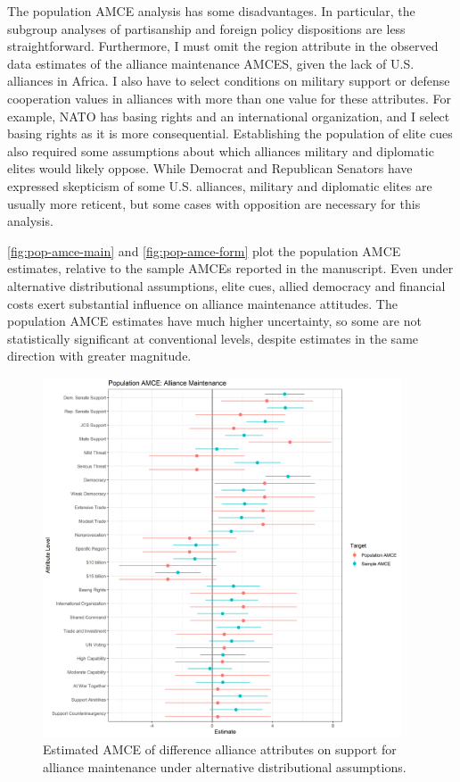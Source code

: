 \documentclass[12pt]{article}
\begin{document}
The population AMCE analysis has some disadvantages. 
In particular, the subgroup analyses of partisanship and foreign policy dispositions are less straightforward. 
Furthermore, I must omit the region attribute in the observed data estimates of the alliance maintenance AMCES, given the lack of U.S. alliances in Africa. 
I also have to select conditions on military support or defense cooperation values in alliances with more than one value for these attributes. 
For example, NATO has basing rights and an international organization, and I select basing rights as it is more consequential.  
Establishing the population of elite cues also required some assumptions about which alliances military and diplomatic elites would likely oppose.
While Democrat and Republican Senators have expressed skepticism of some U.S. alliances, military and diplomatic elites are usually more reticent, but some cases with opposition are necessary for this analysis. 


\autoref{fig:pop-amce-main} and \autoref{fig:pop-amce-form} plot the population AMCE estimates, relative to the sample AMCEs reported in the manuscript. 
Even under alternative distributional assumptions, elite cues, allied democracy and financial costs exert substantial influence on alliance maintenance attitudes. 
The population AMCE estimates have much higher uncertainty, so some are not statistically significant at conventional levels, despite estimates in the same direction with greater magnitude. 



\begin{figure}
	\centering
		\includegraphics[width=0.95\textwidth]{pop-amce-main.png}
	\caption{Estimated AMCE of difference alliance attributes on support for alliance maintenance under alternative distributional assumptions.}
	\label{fig:pop-amce-main}
\end{figure}
\end{document}
